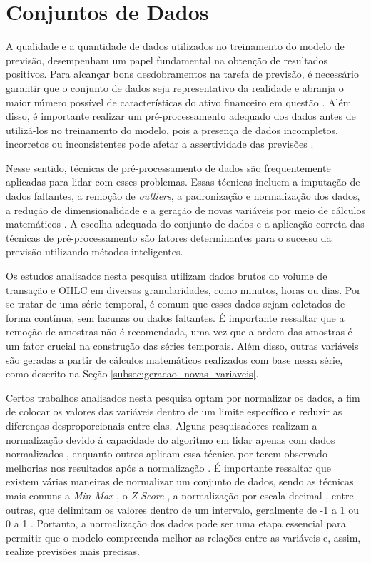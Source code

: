 \section{Conjuntos de Dados}
\label{subsec:conjunto_dados}
A qualidade e a quantidade de dados utilizados no treinamento do modelo de previsão, desempenham um papel fundamental na obtenção de resultados positivos. Para alcançar bons desdobramentos na tarefa de previsão, é necessário garantir que o conjunto de dados seja representativo da realidade e abranja o maior número possível de características do ativo financeiro em questão \cite{kumar2020data}. Além disso, é importante realizar um pré-processamento adequado dos dados antes de utilizá-los no treinamento do modelo, pois a presença de dados incompletos, incorretos ou inconsistentes pode afetar a assertividade das previsões \cite{kaur2019systematic}.

Nesse sentido, técnicas de pré-processamento de dados são frequentemente aplicadas para lidar com esses problemas. Essas técnicas incluem a imputação de dados faltantes, a remoção de \textit{outliers}, a padronização e normalização dos dados, a redução de dimensionalidade e a geração de novas variáveis por meio de cálculos matemáticos \cite{tomasevic2020overview}. A escolha adequada do conjunto de dados e a aplicação correta das técnicas de pré-processamento são fatores determinantes para o sucesso da previsão utilizando métodos inteligentes.

Os estudos analisados nesta pesquisa utilizam dados brutos do volume de transação e \ac{OHLC} em diversas granularidades, como minutos, horas ou dias. Por se tratar de uma série temporal, é comum que esses dados sejam coletados de forma contínua, sem lacunas ou dados faltantes. É importante ressaltar que a remoção de amostras não é recomendada, uma vez que a ordem das amostras é um fator crucial na construção das séries temporais. Além disso, outras variáveis são geradas a partir de cálculos matemáticos realizados com base nessa série, como descrito na Seção \ref{subsec:geracao_novas_variaveis}.

Certos trabalhos analisados nesta pesquisa optam por normalizar os dados, a fim de colocar os valores das variáveis dentro de um limite específico e reduzir as diferenças desproporcionais entre elas. Alguns pesquisadores realizam a normalização devido à capacidade do algoritmo em lidar apenas com dados normalizados \cite{Manrui_two-stage}, enquanto outros aplicam essa técnica por terem observado melhorias nos resultados após a normalização \cite{Anand_Comparison, Chaojie_Stock}. É importante ressaltar que existem várias maneiras de normalizar um conjunto de dados, sendo as técnicas mais comuns a \textit{Min-Max} \cite{Leonardo_Comparative, Gourav_Swarm}, o \textit{Z-Score} \cite{fei2021z}, a normalização por escala decimal \cite{patro2015normalization}, entre outras, que delimitam os valores dentro de um intervalo, geralmente de -1 a 1 ou 0 a 1 \cite{Jerzy_Deep}. Portanto, a normalização dos dados pode ser uma etapa essencial para permitir que o modelo compreenda melhor as relações entre as variáveis e, assim, realize previsões mais precisas.



